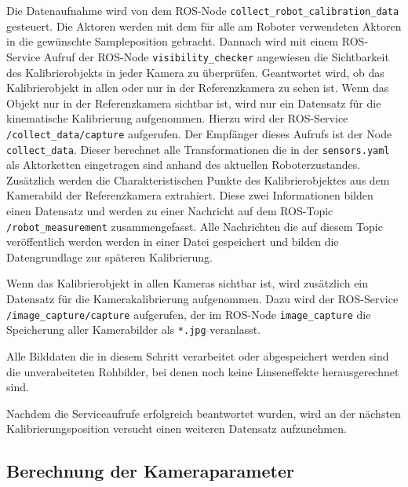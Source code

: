 Die Datenaufnahme wird von dem \ac{ROS}-Node \texttt{collect\_robot\_\allowbreak calibration\_\allowbreak data}
gesteuert. Die Aktoren werden mit dem für alle am Roboter verwendeten Aktoren in
die gewünschte Sampleposition gebracht. Dannach wird mit einem \ac{ROS}-Service
Aufruf der \ac{ROS}-Node \texttt{visibility\_checker} angewiesen die Sichtbarkeit
des Kalibrierobjekts in jeder Kamera zu überprüfen. Geantwortet wird, ob das 
Kalibrierobjekt in allen oder nur in der Referenzkamera zu sehen ist. 
Wenn das Objekt nur in der Referenzkamera sichtbar ist, wird nur ein Datensatz
für die kinematische Kalibrierung aufgenommen. Hierzu wird der \ac{ROS}-Service
\texttt{/collect\_data/capture} aufgerufen. Der Empfänger dieses Aufrufs ist 
der Node \texttt{collect\_data}. Dieser berechnet alle Transformationen die in 
der \texttt{sensors.yaml} als Aktorketten eingetragen sind anhand des aktuellen
Roboterzustandes. Zusätzlich werden die Charakteristischen Punkte des Kalibrierobjektes
aus dem Kamerabild der Referenzkamera extrahiert. Diese zwei Informationen 
bilden einen Datensatz und werden zu einer Nachricht auf dem \ac{ROS}-Topic
\texttt{/robot\_measurement} zusammengefasst. Alle Nachrichten die auf diesem 
Topic veröffentlich werden werden in einer Datei gespeichert und bilden die
Datengrundlage zur späteren Kalibrierung.

Wenn das Kalibrierobjekt in allen Kameras sichtbar ist, wird zusätzlich ein 
Datensatz für die Kamerakalibrierung aufgenommen. Dazu wird der \ac{ROS}-Service
\texttt{/image\_capture/capture} aufgerufen, der im \ac{ROS}-Node \texttt{image\_capture}
die Speicherung aller Kamerabilder als \texttt{*.jpg} veranlasst.

Alle Bilddaten die in diesem Schritt verarbeitet oder abgespeichert werden sind
die unverabeiteten Rohbilder, bei denen noch keine Linseneffekte herausgerechnet
sind.

Nachdem die Serviceaufrufe erfolgreich beantwortet wurden, wird an der nächsten
Kalibrierungsposition versucht einen weiteren Datensatz aufzunehmen.

\subsection{Berechnung der Kameraparameter}
\label{sub:Berechnung der Kameraparameter}

